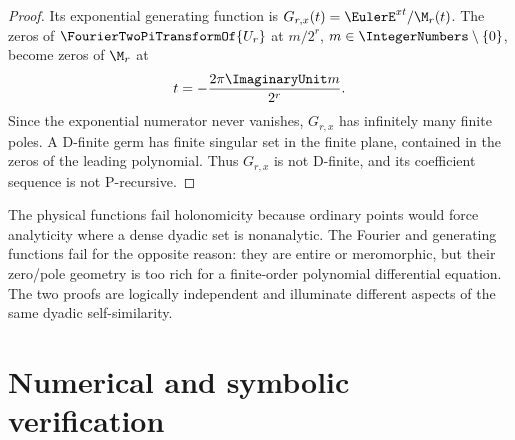 \documentclass[11pt]{article}
\numberwithin{equation}{section}
\theoremstyle{definition}
\theoremstyle{remark}
\begin{document}
\begin{proof}
Its exponential generating function is $G_{r,x}(t)=\EulerE^{xt}/\M_r(t)$.  The zeros of $\FourierTwoPiTransformOf{U_r}$ at $m/2^r$, $m\in\IntegerNumbers\setminus\{0\}$, become zeros of $\M_r$ at
\begin{equation}
 t=-\frac{2\pi\ImaginaryUnit m}{2^r}.
 \label{p4:eq:mgf-zeros}
\end{equation}
Since the exponential numerator never vanishes, $G_{r,x}$ has infinitely many finite poles.  A D-finite germ has finite singular set in the finite plane, contained in the zeros of the leading polynomial.  Thus $G_{r,x}$ is not D-finite, and its coefficient sequence is not P-recursive.
\end{proof}

\begin{corpusdeductionbox}[title=Two-sided holonomic exclusion]
The physical functions fail holonomicity because ordinary points would force analyticity where a dense dyadic set is nonanalytic.  The Fourier and generating functions fail for the opposite reason: they are entire or meromorphic, but their zero/pole geometry is too rich for a finite-order polynomial differential equation.  The two proofs are logically independent and illuminate different aspects of the same dyadic self-similarity.
\end{corpusdeductionbox}

\section{Numerical and symbolic verification}
\label{p4:sec:numerics}
\end{document}
